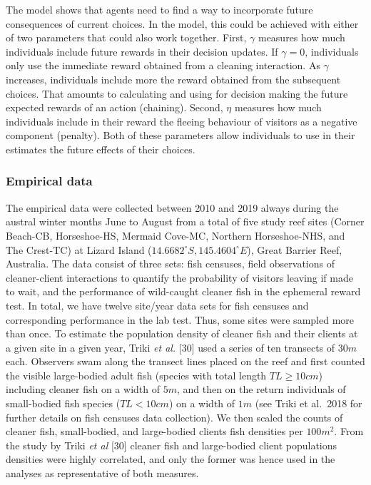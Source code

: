 \documentclass[10pt,letterpaper]{article}
\begin{document}
The model shows that agents need to find a way to incorporate future
consequences of current choices. In the model, this could be achieved
with either of two parameters that could also work together. First,
\(\gamma\) measures how much individuals include future rewards in their
decision updates. If \(\gamma=0\), individuals only use the immediate
reward obtained from a cleaning interaction. As \(\gamma\) increases,
individuals include more the reward obtained from the subsequent
choices. That amounts to calculating and using for decision making the
future expected rewards of an action (chaining). Second, \(\eta\)
measures how much individuals include in their reward the fleeing
behaviour of visitors as a negative component (penalty). Both of these
parameters allow individuals to use in their estimates the future
effects of their choices.

\hypertarget{empirical-data}{%
\subsubsection{Empirical data}\label{empirical-data}}

The empirical data were collected between 2010 and 2019 always during
the austral winter months June to August from a total of five study reef
sites (Corner Beach-CB, Horseshoe-HS, Mermaid Cove-MC, Northern
Horseshoe-NHS, and The Crest-TC) at Lizard Island
(\(14.6682^\circ S, 145.4604^\circ E\)), Great Barrier Reef, Australia.
The data consist of three sets: fish censuses, field observations of
cleaner-client interactions to quantify the probability of visitors
leaving if made to wait, and the performance of wild-caught cleaner fish
in the ephemeral reward test. In total, we have twelve site/year data
sets for fish censuses and corresponding performance in the lab test.
Thus, some sites were sampled more than once. To estimate the population
density of cleaner fish and their clients at a given site in a given
year, Triki \emph{et al.} {[}30{]} used a series of ten transects of
\(30m\) each. Observers swam along the transect lines placed on the reef
and first counted the visible large-bodied adult fish (species with
total length \(TL \geq 10cm\)) including cleaner fish on a width of
\(5m\), and then on the return individuals of small-bodied fish species
(\(TL < 10 cm\)) on a width of \(1 m\) (see Triki et al.~2018 for
further details on fish censuses data collection). We then scaled the
counts of cleaner fish, small-bodied, and large-bodied clients fish
densities per \(100 m^2\). From the study by Triki \emph{et al} {[}30{]}
cleaner fish and large-bodied client populations densities were highly
correlated, and only the former was hence used in the analyses as
representative of both measures.
\end{document}
